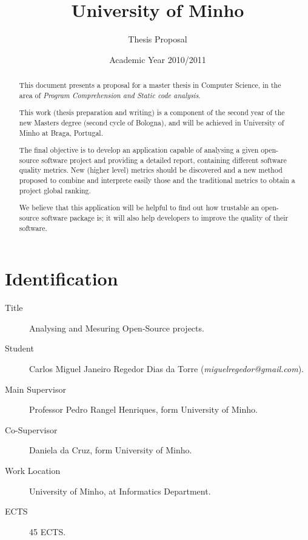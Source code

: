 \documentclass[12pt]{article}
\begin{document}
\title{University of Minho}
\author{Thesis Proposal}

\date{Academic Year 2010/2011}
\maketitle 

\section*{Identification}
\begin{description}
\item[Title] \textsf{Analysing and Mesuring Open-Source projects}.
\item[Student] \textsf{Carlos Miguel Janeiro Regedor Dias da Torre }(\textit{miguelregedor@gmail.com}).
\item[Main Supervisor] \textsf{Professor Pedro Rangel Henriques}, form University of Minho.
\item [Co-Supervisor] \textsf{Daniela da Cruz}, form University of Minho.
\item [Work Location] University of Minho, at Informatics Department.
\item [ECTS] 45 ECTS.
\end{description}


\begin{abstract}
This document presents a proposal for a master thesis in Computer Science, in the area of \textit{Program Comprehension and Static code analysis}.

This work (thesis preparation and writing) is a component of the second year of the new Masters degree (second cycle of Bologna), and will be achieved in University of Minho at Braga, Portugal.

The final objective is to develop an application capable of analysing a given open-source software project and providing a detailed report, containing different software quality metrics. 
New (higher level) metrics should be discovered and a new method proposed to 
combine and interprete easily those and the traditional metrics to obtain
a project global ranking.    

We believe that this application will be helpful to find out how trustable an open-source software package is; 
it will also help developers to improve the quality of their software.
\end{abstract}
\end{document}
